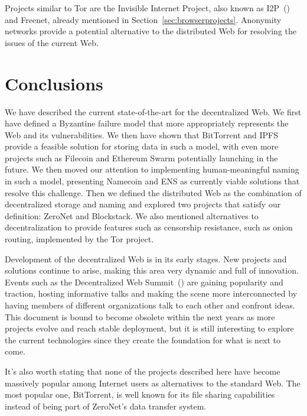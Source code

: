 \documentclass[mscthesis]{usiinfthesis}
\begin{document}
Projects similar to Tor are the Invisible Internet Project, also known as I2P~(\cite{i2p}) and Freenet, already mentioned in Section~\ref{sec:browserprojects}. Anonymity networks provide a potential alternative to the distributed Web for resolving the issues of the current Web. %

\chapter{Conclusions}\label{ch:conclusions}

We have described the current state-of-the-art for the decentralized Web. We first have defined a Byzantine failure model that more appropriately represents the Web and its vulnerabilities. We then have shown that BitTorrent and IPFS provide a feasible solution for storing data in such a model, with even more projects such as Filecoin and Ethereum Swarm potentially launching in the future. We then moved our attention to implementing human-meaningful naming in such a model, presenting Namecoin and ENS as currently viable solutions that resolve this challenge. Then we defined the distributed Web as the combination of decentralized storage and naming and explored two projects that satisfy our definition: ZeroNet and Blockstack. We also mentioned alternatives to decentralization to provide features such as censorship resistance, such as onion routing, implemented by the Tor project.

Development of the decentralized Web is in its early stages. New projects and solutions continue to arise, making this area very dynamic and full of innovation. Events such as the Decentralized Web Summit~(\cite{website:dws}) are gaining popularity and traction, hosting informative talks and making the scene more interconnected by having members of different organizations talk to each other and confront ideas. This document is bound to become obsolete within the next years as more projects evolve and reach stable deployment, but it is still interesting to explore the current technologies since they create the foundation for what is next to come.

It's also worth stating that none of the projects described here have become massively popular among Internet users as alternatives to the standard Web. The most popular one, BitTorrent, is well known for its file sharing capabilities instead of being part of ZeroNet's data transfer system. %
\end{document}
